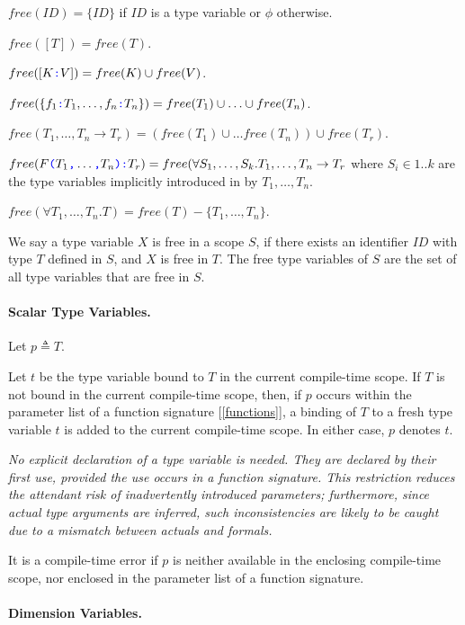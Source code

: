 \documentclass{article}
\begin{document}
 
 $free(ID) = \{ID\}$ if $ID$ is a type variable or $\phi$ otherwise.
 
 $free([T]) = free(T)$.
 
 $free([K \texttt{\color{blue} :}{} V]) = free(K) \cup free(V)$.
 
 $free(\{f_1\texttt{\color{blue} :}{} T_1, \ldots, f_n\texttt{\color{blue} :}{} T_n\}) =  free(T_1) \cup \ldots \cup free(T_n)$.
 
 $free(T_1, \ldots, T_n \to T_r) = (free(T_1) \cup \ldots free(T_n)) \cup free(T_r)$. 
 
 $free(F\texttt{\color{blue} (}{} T_1\texttt{\color{blue} ,}{} \ldots\texttt{\color{blue} ,}{} T_n\texttt{\color{blue} )}\texttt{\color{blue} :}{}T_r) = free(\forall S_1, \ldots, S_k. T_1, \ldots, T_n \to T_r$ where $S_i \in 1..k$ are the type variables implicitly introduced in by $T_1, \ldots, T_n$.
 
 $free(\forall T_1, \ldots, T_n.T) = free(T) - \{T_1, \ldots, T_n\}$.
 
 
 We say a type variable $X$ is free in a scope $S$, if there exists an identifier $ID$ with type $T$ defined in $S$, and $X$ is free in $T$. The free type variables of $S$ are the set of all type variables that are free in $S$.

\paragraph{Scalar Type Variables.}
 
 Let $p \triangleq T$.
 
 Let $t$ be the type variable bound to $T$ in the current compile-time scope. If $T$ is not bound in the current compile-time scope, then, if $p$ occurs within  the parameter list of a function signature [\ref{functions}],  a binding of $T$ to a fresh type variable $t$ is added to the current compile-time scope. In either case, $p$ denotes  $t$. 
 
 {\em 
No explicit declaration of a type variable is needed. They are declared by their first use, provided the use occurs in a function signature. This restriction reduces the attendant risk of inadvertently introduced parameters; furthermore, since
 actual type arguments are inferred, such inconsistencies are likely to be caught due to a mismatch between actuals and formals.
 } 
 
 It is a compile-time error if $p$ is neither available in the enclosing compile-time scope, nor enclosed in the parameter list of a function signature.
 
 \paragraph{Dimension Variables.}
 
\end{document}
